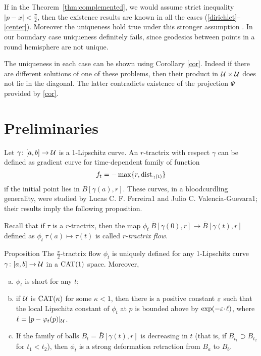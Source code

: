 \documentclass[oneside,a4paper, 12pt]{article}
\begin{document}
If in the Theorem~\ref{thm:complemented}, we would assume strict inequality $|p-x|< \tfrac\pi2$, then the existence results are known  in all the cases (\ref{dirichlet}--\ref{center}).
Moreover the uniqueness hold true under this stronger assumption
\cite{Yokota,Serbinowski}.
In our boundary case uniqueness definitely fails, since geodesics between points in a round hemisphere are not unique.

The uniqueness in each case can be shown using Corollary \ref{cor}.
Indeed if there are different solutions of one of these problems, then their product in ${\mathcal{U}}\times {\mathcal{U}}$ does not lie in the diagonal.
The latter contradicts existence of the projection $\Psi$ provided by \ref{cor}.

\section{Preliminaries}\label{sec:Tractrix flow}

Let $\gamma\colon[a,b]\to \mathcal{U}$ is a 1-Lipschitz curve. 
An $r$-tractrix with respect $\gamma$ can be defined as gradient curve for time-dependent family of function 
\[f_t=- \max\{r,\mathop{\rm dist}\nolimits_{\gamma(t)}\}\]
if the initial point lies in $B[\gamma(a),r]$.
These curves, in a bloodcurdling generality, were studied by Lucas C. F. Ferreira1 and Julio C. Valencia-Guevara1;
their results \cite[5.4 and 5.9 in][]{ferreira-valencia} imply the following proposition.

Recall that if $\tau$ is a $r$-tractrix, then the map $\phi_t\:\bar B[\gamma(0),r]\to\bar B[\gamma(t),r] $ defined as $\phi_t\:\tau(a)\mapsto \tau(t)$ is called $r$-\emph{tractrix flow}.

\begin{thm}{Proposition}\label{prop-def}
The $\tfrac\pi2$-tractrix flow $\phi_t$ is uniquely defined for any 1-Lipschitz curve $\gamma\colon[a,b]\to \mathcal{U}$ in a  $\mathrm{CAT}(1)$ space.
Moreover,
\begin{enumerate}[(a)]
 \item $\phi_t$ is short for any $t$;
 \item if ${\mathcal{U}}$ is $\mathrm{CAT}(\kappa)$ for some $\kappa<1$, then there is a positive constant $\varepsilon$ such that the local Lipschitz constant of $\phi_t$ at $p$ is bounded above by $\exp(-\eps\cdot\ell)$, where $\ell=|p-\varphi_t(p)|_{\mathcal{U}}$.
 \item If the family of balls $B_t=\bar B[\gamma(t),r]$ is decreasing in $t$ (that is, if $B_{t_1}\supset B_{t_2}$ for $t_1<t_2$), then $\phi_t$ is a strong deformation retraction from $B_a$ to $B_b$.
\end{enumerate}
\end{thm}
\end{document}
